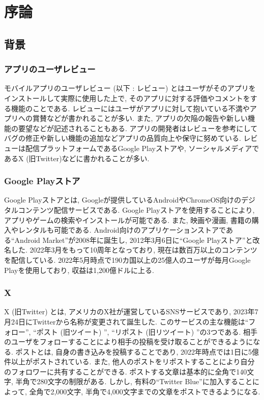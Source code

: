 \chapter{序論}
\label{chap:jyoron}

\section{背景}

\subsection{アプリのユーザレビュー}
モバイルアプリのユーザレビュー (以下 : レビュー) とはユーザがそのアプリをインストールして実際に使用した上で, そのアプリに対する評価やコメントをする機能のことである. 
レビューにはユーザがアプリに対して抱いている不満やアプリへの賞賛などが書かれることが多い. また, アプリの欠陥の報告や新しい機能の要望などが記述されることもある. 
アプリの開発者はレビューを参考にしてバグの修正や新しい機能の追加などアプリの品質向上や保守に努めている. 
レビューは配信プラットフォームであるGoogle Playストアや, ソーシャルメディアであるX (旧Twitter)などに書かれることが多い. 

\subsection{Google Playストア}
Google Playストア\cite{google-play-store}とは, Googleが提供しているAndroidやChromeOS向けのデジタルコンテンツ配信サービスである. Google Playストアを使用することにより, アプリやゲームの検索やインストールが可能である. また, 映画や漫画, 書籍の購入やレンタルも可能である. 
Android向けのアプリケーションストアである``Android Market''が2008年に誕生し, 2012年3月6日に``Google Playストア''と改名した. 2022年3月をもって10周年となっており, 現在は数百万以上のコンテンツを配信している\cite{about-google-play}. 
2022年5月時点で190カ国以上の25億人のユーザが毎月Google Playを使用しており, 収益は1,200億ドルに上る\cite{purnima-kochikar}. 

\subsection{X}
X (旧Twitter) \cite{twitter}とは, アメリカのX社が運営しているSNSサービスであり, 2023年7月24日にTwitterから名称が変更されて誕生した. 
このサービスの主な機能は``フォロー'', ``ポスト (旧ツイート) '', ``リポスト (旧リツイート) ''の3つである. 相手のユーザをフォローすることにより相手の投稿を受け取ることができるようになる. ポストとは, 自身の書き込みを投稿することであり, 2022年時点では1日に5億件以上がポストされている\cite{aboutx}. また, 他人のポストをリポストすることにより自分のフォロワーに共有することができる. 
ポストする文章は基本的に全角で140文字, 半角で280文字の制限がある. しかし, 有料の``Twitter Blue''に加入することによって, 全角で2,000文字, 半角で4,000文字までの文章をポストできるようになる. 

